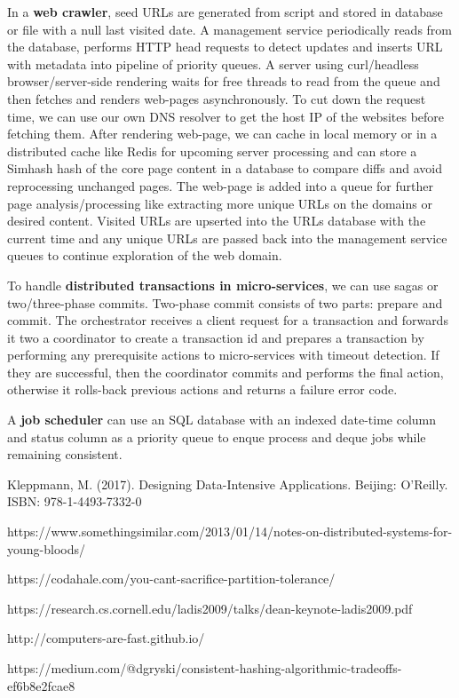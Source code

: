 \documentclass{article}
\begin{document}
    In a \textbf{web crawler}, seed URLs are generated from script and stored in database or file with a null last visited date. A management service periodically reads from the database, performs HTTP head requests to detect updates and inserts URL with metadata into pipeline of priority queues. A server using curl/headless browser/server-side rendering waits for free threads to read from the queue and then fetches and renders web-pages asynchronously. To cut down the request time, we can use our own DNS resolver to get the host IP of the websites before fetching them. After rendering web-page, we can cache in local memory or in a distributed cache like Redis for upcoming server processing and can store a Simhash hash of the core page content in a database to compare diffs and avoid reprocessing unchanged pages. The web-page is added into a queue for further page analysis/processing like extracting more unique URLs on the domains or desired content. Visited URLs are upserted into the URLs database with the current time and any unique URLs are passed back into the management service queues to continue exploration of the web domain.
    
    To handle \textbf{distributed transactions in micro-services}, we can use sagas or two/three-phase commits. Two-phase commit consists of two parts: prepare and commit. The orchestrator receives a client request for a transaction and forwards it two a coordinator to create a transaction id and prepares a transaction by performing any prerequisite actions to micro-services with timeout detection. If they are successful, then the coordinator commits and performs the final action, otherwise it rolls-back previous actions and returns a failure error code.
    
    A \textbf{job scheduler} can use an SQL database with an indexed date-time column and status column as a priority queue to enque process and deque jobs while remaining consistent.


\newpage
\begin{thebibliography}{}
Kleppmann, M. (2017). Designing Data-Intensive Applications. Beijing: O'Reilly. ISBN: 978-1-4493-7332-0

https://www.somethingsimilar.com/2013/01/14/notes-on-distributed-systems-for-young-bloods/

https://codahale.com/you-cant-sacrifice-partition-tolerance/


https://research.cs.cornell.edu/ladis2009/talks/dean-keynote-ladis2009.pdf

http://computers-are-fast.github.io/

https://medium.com/@dgryski/consistent-hashing-algorithmic-tradeoffs-ef6b8e2fcae8

\end{thebibliography}
\end{document}
